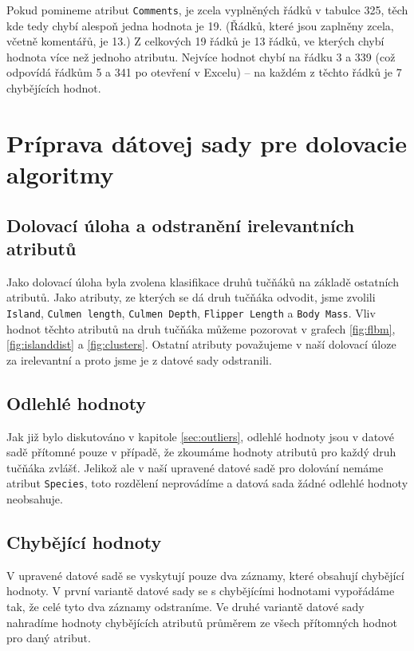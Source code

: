\documentclass[10pt,xcolor=pdflatex,dvipsnames,table,oneside]{book}
\begin{document}
Pokud pomineme atribut \texttt{Comments}, je zcela vyplněných řádků v tabulce 325, těch kde tedy chybí alespoň jedna hodnota je 19. (Řádků, které jsou zaplněny zcela, včetně komentářů, je 13.)
Z celkových 19 řádků je 13 řádků, ve kterých chybí hodnota více než jednoho atributu. Nejvíce hodnot chybí na řádku 3 a 339 (což odpovídá řádkům 5 a 341 po otevření v Excelu) -- na každém z těchto řádků je 7 chybějících hodnot.



\chapter{Príprava dátovej sady pre dolovacie algoritmy}

\section*{Dolovací úloha a odstranění irelevantních atributů}
Jako dolovací úloha byla zvolena klasifikace druhů tučňáků na základě ostatních atributů. Jako atributy, ze kterých se dá druh tučňáka odvodit, jsme zvolili \texttt{Island}, \texttt{Culmen length}, \texttt{Culmen Depth}, \texttt{Flipper Length} a \texttt{Body Mass}. Vliv hodnot těchto atributů na druh tučňáka můžeme pozorovat v grafech \ref{fig:flbm}, \ref{fig:islanddist} a \ref{fig:clusters}. Ostatní atributy považujeme v naší dolovací úloze za irelevantní a proto jsme je z datové sady odstranili. 

\section*{Odlehlé hodnoty}
Jak již bylo diskutováno v kapitole \ref{sec:outliers}, odlehlé hodnoty jsou v datové sadě přítomné pouze v případě, že zkoumáme hodnoty atributů pro každý druh tučňáka zvlášť. Jelikož ale v naší upravené datové sadě pro dolování nemáme atribut \texttt{Species}, toto rozdělení neprovádíme a datová sada žádné odlehlé hodnoty neobsahuje. 

\section*{Chybějící hodnoty}
V upravené datové sadě se vyskytují pouze dva záznamy, které obsahují chybějící hodnoty. V první variantě datové sady se s chybějícími hodnotami vypořádáme tak, že celé tyto dva záznamy odstraníme. Ve druhé variantě datové sady nahradíme hodnoty chybějících atributů průměrem ze všech přítomných hodnot pro daný atribut. 
\end{document}
